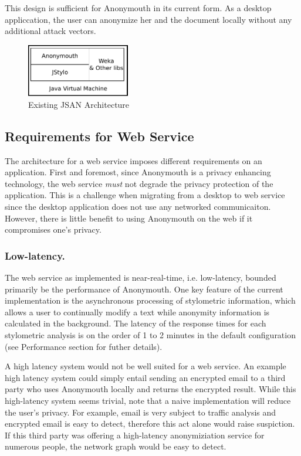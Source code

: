 \documentclass[letterpaper]{article}
\begin{document}
This design is sufficient for Anonymouth in its current form.  As a
desktop appliccation, the user can anonymize her and the document
locally without any additional attack vectors.

\begin{figure}
  \centering
    \includegraphics[width=0.4\textwidth]{img/jsan.pdf}
  \caption{Existing JSAN Architecture}
  \label{fig:jsan}
\end{figure}

\subsection{Requirements for Web Service}

The architecture for a web service imposes different requirements on
an application.  First and foremost, since Anonymouth is a privacy
enhancing technology, the web service \emph{must} not degrade the
privacy protection of the application.  This is a challenge when
migrating from a desktop to web service since the desktop application
does not use any networked communicaiton.  However, there is little
benefit to using Anonymouth on the web if it compromises one's
privacy.

\subsubsection{Low-latency.}
The web service as implemented is near-real-time, i.e. low-latency,
bounded primarily be the performance of Anonymouth. One key feature of
the current implementation is the asynchronous processing of
stylometric information, which allows a user to continually modify a
text while anonymity information is calculated in the background. The
latency of the response times for each stylometric analysis is on the
order of 1 to 2 minutes in the default configuration (see Performance
section for futher details).

A high latency system would not be well suited for a web service.  An
example high latency system could simply entail sending an encrypted
email to a third party who uses Anonymouth locally and returns the
encrypted result.  While this high-latency system seems trivial, note
that a naive implementation will reduce the user's privacy.  For
example, email is very subject to traffic analysis
\cite{Mathewson04practicaltraffic} and encrypted email is easy to
detect, therefore this act alone would raise suspiction.  If
this third party was offering a high-latency anonymiziation service
for numerous people, the network graph would be easy to detect.
\end{document}
